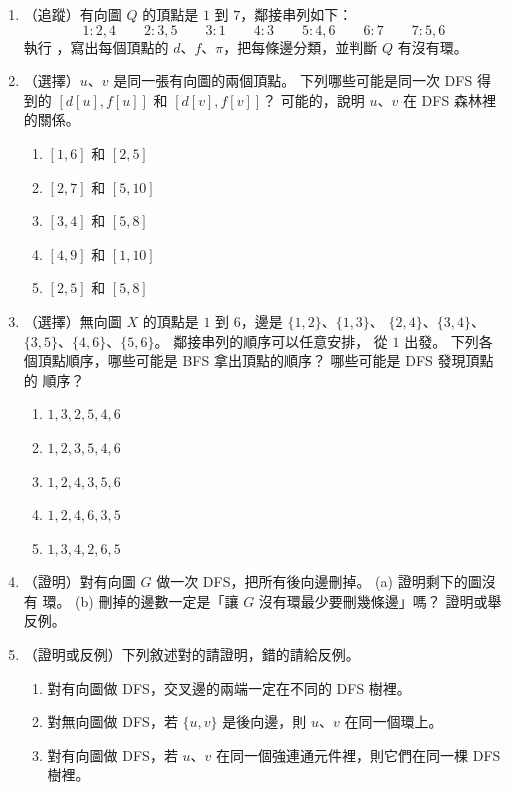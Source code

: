 \begin{enumerate}
\item \label{q:gtr-dfs-q}（追蹤）有向圖 $Q$ 的頂點是 $1$ 到 $7$，鄰接串列如下：
\[
1\colon 2, 4 \qquad 2\colon 3, 5 \qquad 3\colon 1 \qquad 4\colon 3 \qquad
5\colon 4, 6 \qquad 6\colon 7 \qquad 7\colon 5, 6
\]
執行 ，寫出每個頂點的 $d$、$f$、$\pi$，把每條邊分類，並判斷 $Q$ 有沒有環。

\item \label{q:gtr-interval}（選擇）$u$、$v$ 是同一張有向圖的兩個頂點。 下列哪些可能是同一次
DFS 得到的 $[d[u], f[u]]$ 和 $[d[v], f[v]]$？ 可能的，說明 $u$、$v$ 在 DFS 森林裡的關係。
\begin{enumerate}
\item $[1, 6]$ 和 $[2, 5]$
\item $[2, 7]$ 和 $[5, 10]$
\item $[3, 4]$ 和 $[5, 8]$
\item $[4, 9]$ 和 $[1, 10]$
\item $[2, 5]$ 和 $[5, 8]$
\end{enumerate}

\item \label{q:gtr-orders}（選擇）無向圖 $X$ 的頂點是 $1$ 到 $6$，邊是 $\{1, 2\}$、$\{1, 3\}$、
$\{2, 4\}$、$\{3, 4\}$、$\{3, 5\}$、$\{4, 6\}$、$\{5, 6\}$。 鄰接串列的順序可以任意安排，
從 $1$ 出發。 下列各個頂點順序，哪些可能是 BFS 拿出頂點的順序？ 哪些可能是 DFS 發現頂點的
順序？
\begin{enumerate}
\item $1, 3, 2, 5, 4, 6$
\item $1, 2, 3, 5, 4, 6$
\item $1, 2, 4, 3, 5, 6$
\item $1, 2, 4, 6, 3, 5$
\item $1, 3, 4, 2, 6, 5$
\end{enumerate}

\item \label{q:gtr-acyclic}（證明）對有向圖 $G$ 做一次 DFS，把所有後向邊刪掉。 (a) 證明剩下的圖沒有
環。 (b) 刪掉的邊數一定是「讓 $G$ 沒有環最少要刪幾條邊」嗎？ 證明或舉反例。

\item \label{q:gtr-tf}（證明或反例）下列敘述對的請證明，錯的請給反例。
\begin{enumerate}
\item 對有向圖做 DFS，交叉邊的兩端一定在不同的 DFS 樹裡。
\item 對無向圖做 DFS，若 $\{u, v\}$ 是後向邊，則 $u$、$v$ 在同一個環上。
\item 對有向圖做 DFS，若 $u$、$v$ 在同一個強連通元件裡，則它們在同一棵 DFS 樹裡。
\end{enumerate}


\end{enumerate}
